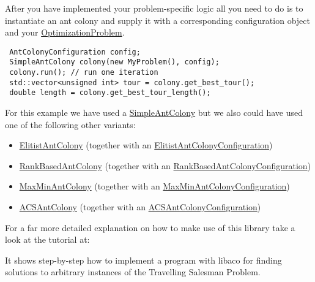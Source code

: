 After you have implemented your problem-specific logic all you need to do is to instantiate an ant colony and supply it with a corresponding configuration object and your \hyperlink{classOptimizationProblem}{OptimizationProblem}.



\begin{Code}\begin{verbatim} AntColonyConfiguration config;
 SimpleAntColony colony(new MyProblem(), config);
 colony.run(); // run one iteration
 std::vector<unsigned int> tour = colony.get_best_tour();
 double length = colony.get_best_tour_length();
\end{verbatim}
\end{Code}



For this example we have used a \hyperlink{classSimpleAntColony}{SimpleAntColony} but we also could have used one of the following other variants:

\begin{itemize}
\item \hyperlink{classElitistAntColony}{ElitistAntColony} (together with an \hyperlink{classElitistAntColonyConfiguration}{ElitistAntColonyConfiguration})\item \hyperlink{classRankBasedAntColony}{RankBasedAntColony} (together with an \hyperlink{classRankBasedAntColonyConfiguration}{RankBasedAntColonyConfiguration})\item \hyperlink{classMaxMinAntColony}{MaxMinAntColony} (together with an \hyperlink{classMaxMinAntColonyConfiguration}{MaxMinAntColonyConfiguration})\item \hyperlink{classACSAntColony}{ACSAntColony} (together with an \hyperlink{classACSAntColonyConfiguration}{ACSAntColonyConfiguration})\end{itemize}


For a far more detailed explanation on how to make use of this library take a look at the tutorial at:

It shows step-by-step how to implement a program with libaco for finding solutions to arbitrary instances of the Travelling Salesman Problem. 